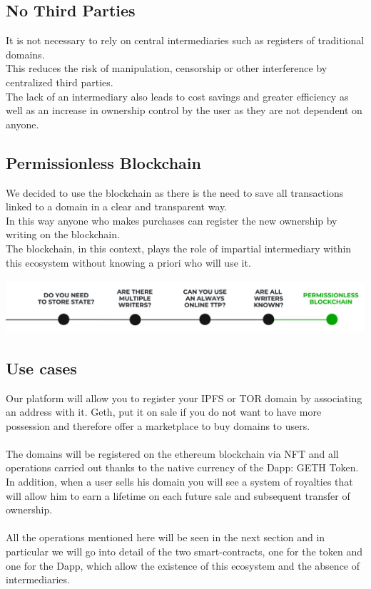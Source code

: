 \documentclass[main.tex]{subfiles}
\begin{document}
\subsection{No Third Parties}
It is not necessary to rely on central intermediaries such as registers of traditional domains.\\
This reduces the risk of manipulation, censorship or other interference by centralized third parties.\\
The lack of an intermediary also leads to cost savings and greater efficiency as well as an increase in ownership control by the user as they are not dependent on anyone.

\subsection{Permissionless Blockchain}
We decided to use the blockchain as there is the need to save all transactions linked to a domain in a clear and transparent way.\\
In this way anyone who makes purchases can register the new ownership by writing on the blockchain.\\
The blockchain, in this context, plays the role of impartial intermediary within this ecosystem without knowing a priori who will use it.\\

\begin{center}
  \includegraphics[height=2cm]{figures/PermBlock.png}
\end{center}

\subsection{Use cases}
Our platform will allow you to register your IPFS or TOR domain by associating an address with it. Geth, put it on sale if you do not want to have more possession and therefore offer a marketplace to buy domains to users.\\\\
The domains will be registered on the ethereum blockchain via NFT and all operations carried out thanks to the native currency of the Dapp: GETH Token.\\
In addition, when a user sells his domain you will see a system of royalties that will allow him to earn a lifetime on each future sale and subsequent transfer of ownership.\\\\
All the operations mentioned here will be seen in the next section and in particular we will go into detail of the two smart-contracts, one for the token and one for the Dapp, which allow the existence of this ecosystem and the absence of intermediaries.
\end{document}
